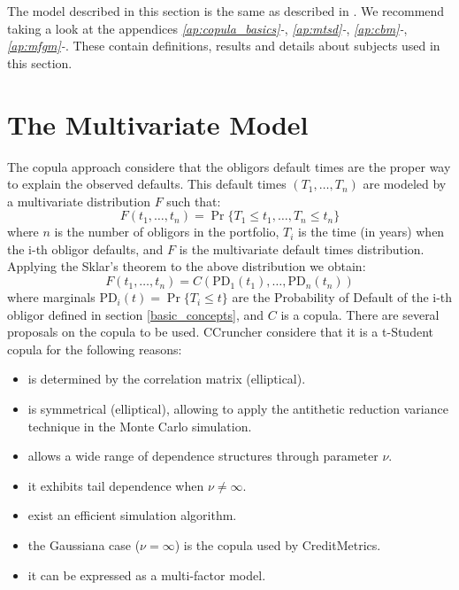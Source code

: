 \documentclass[11pt,fleqn]{book} %
\begin{document}
The model described in this section is the same as described in \cite{li:2000} 
\cite{roncalli:2001} \cite{bluhm:2002} \cite{frey:2001}.
We recommend taking a look at the appendices 
\emph{\ref{ap:copula_basics}-},
\emph{\ref{ap:mtsd}-},
\emph{\ref{ap:cbm}-},
\emph{\ref{ap:mfgm}-}.
These contain definitions, results and details about subjects used 
in this section.

\section{The Multivariate Model}

The copula approach considere that the obligors default times are the 
proper way to explain the observed defaults. This default times 
$(T_1, \dots, T_n)$ are modeled by a multivariate distribution $F$ 
such that:
\begin{displaymath}
	F(t_1, \dots, t_n) = \Pr \{T_1 \le t_1, \dots, T_n \le t_n\}
\end{displaymath}
where $n$ is the number of obligors in the portfolio, $T_i$ is the time 
(in years) when the i-th obligor defaults, and $F$ is the multivariate
default times distribution. Applying the Sklar's theorem to the above 
distribution we obtain:
\begin{displaymath}
	F(t_1, \dots, t_n) = 
	C\left(\text{PD}_1(t_1), \dots, \text{PD}_n(t_n)\right)
\end{displaymath}
where marginals $\text{PD}_i(t) = \Pr\{T_i \le t\}$ are the Probability 
of Default of the i-th obligor defined in section \ref{basic_concepts}, 
and $C$ is a copula. There are several proposals on the copula to be 
used. CCruncher considere that it is a t-Student copula for the following 
reasons:

\begin{itemize}
	\item is determined by the correlation matrix (elliptical). 
	\item is symmetrical (elliptical), allowing to 
	apply the antithetic reduction variance technique in the Monte Carlo 
	simulation.
	\item allows a wide range of dependence structures through parameter $\nu$.
	\item it exhibits tail dependence when $\nu \ne \infty$.
	\item exist an efficient simulation algorithm.
	\item the Gaussiana case ($\nu = \infty$) is the copula used by 
	CreditMetrics\texttrademark.
	\item it can be expressed as a multi-factor model.
\end{itemize}
\end{document}
